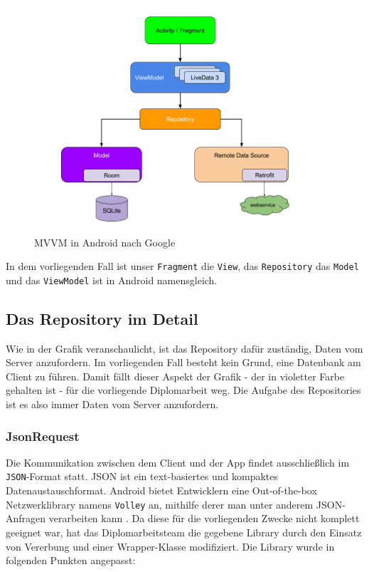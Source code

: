 \begin{figure}
\centering
\includegraphics{josip-pics/mvvm.png}
\caption{MVVM in Android nach Google \cite{mvvm}}
\end{figure}

In dem vorliegenden Fall ist unser \texttt{Fragment} die \texttt{View},
das \texttt{Repository} das \texttt{Model} und das \texttt{ViewModel}
ist in Android namensgleich.

\hypertarget{das-repository-im-detail}{%
\subsection{Das Repository im Detail}\label{das-repository-im-detail}}

Wie in der Grafik veranschaulicht, ist das Repository dafür zuständig,
Daten vom Server anzufordern. Im vorliegenden Fall besteht kein Grund,
eine Datenbank am Client zu führen. Damit fällt dieser Aspekt der Grafik
- der in violetter Farbe gehalten ist - für die vorliegende Diplomarbeit
weg. Die Aufgabe des Repositories ist es also immer Daten vom Server
anzufordern.

\hypertarget{jsonrequest}{%
\subsubsection{JsonRequest}\label{jsonrequest}}

Die Kommunikation zwischen dem Client und der App findet ausschließlich
im \texttt{JSON}-Format statt. JSON ist ein text-basiertes und kompaktes
Datenaustauschformat. Android bietet Entwicklern eine Out-of-the-box
Netzwerklibrary namens \texttt{Volley} an, mithilfe derer man unter
anderem JSON-Anfragen verarbeiten kann \cite{volley}. Da diese für die
vorliegenden Zwecke nicht komplett geeignet war, hat das
Diplomarbeitsteam die gegebene Library durch den Einsatz von Vererbung
und einer Wrapper-Klasse modifiziert. Die Library wurde in folgenden
Punkten angepasst:

